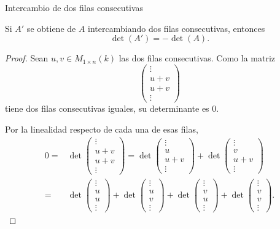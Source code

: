 \begin{frame}[allowframebreaks, t]{Intercambio de dos filas consecutivas}

\begin{proposition}
Si \(A'\) se obtiene de \(A\) intercambiando dos filas consecutivas,
entonces
\[
\det(A')=-\det(A).
\]
\end{proposition}

\begin{proof}
Sean \(u,v\in M_{1\times n}(k)\) las dos filas consecutivas. Como
la matriz
\[
\left(
\begin{array}{c}
\vdots\\
\hline
u+v\\
u+v\\
\hline
\vdots
\end{array}
\right)
\]
tiene dos filas consecutivas iguales, su determinante es \(0\).

\framebreak

Por la linealidad respecto de cada una de esas filas,
\[
\begin{aligned}
0 ={}&
\det
\left(
\begin{array}{c}
\vdots\\
\hline
u+v\\
u+v\\
\hline
\vdots
\end{array}
\right)
={}
\det
\left(
\begin{array}{c}
\vdots\\
\hline
u\\
u+v\\
\hline
\vdots
\end{array}
\right)
+
\det
\left(
\begin{array}{c}
\vdots\\
\hline
v\\
u+v\\
\hline
\vdots
\end{array}
\right)\\
={}&
\det
\left(
\begin{array}{c}
\vdots\\
\hline
u\\
u\\
\hline
\vdots
\end{array}
\right)
+
\det
\left(
\begin{array}{c}
\vdots\\
\hline
u\\
v\\
\hline
\vdots
\end{array}
\right)
+
\det
\left(
\begin{array}{c}
\vdots\\
\hline
v\\
u\\
\hline
\vdots
\end{array}
\right)
+
\det
\left(
\begin{array}{c}
\vdots\\
\hline
v\\
v\\
\hline
\vdots
\end{array}
\right).
\end{aligned}
\]


\end{proof}
\end{frame}

